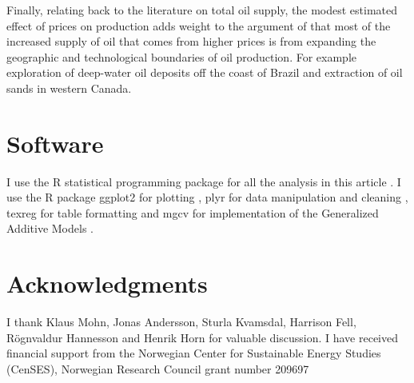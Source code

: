 \documentclass[11pt]{article}
\begin{document}
Finally, relating back to the literature on total oil supply, the modest estimated effect of prices on production adds weight to the argument of \citet{hamilton_oil_2012} that most of the increased supply of oil that comes from higher prices is from expanding the geographic and technological boundaries of oil production.  For example exploration of deep-water oil deposits off the coast of Brazil and extraction of oil sands in western Canada.

\FloatBarrier
\section{Software}
I use the R statistical programming package for all the analysis in this article \citep{r_core_team_r:_2013}.  I use the R package ggplot2 for plotting \citep{wickham_ggplot2:_2009}, plyr for data manipulation and cleaning \citep{wickham_split-apply-combine_2011}, texreg for table formatting \citep{leifeld_texreg:_2013} and mgcv for implementation of the Generalized Additive Models \citep{wood_fast_2011}.

\section{Acknowledgments}
I thank Klaus Mohn, Jonas Andersson, Sturla Kvamsdal, Harrison Fell, R\"ognvaldur Hannesson and Henrik Horn for valuable discussion. I have received financial support from the Norwegian Center for Sustainable Energy Studies (CenSES), Norwegian Research Council grant number 209697 



\end{document}
